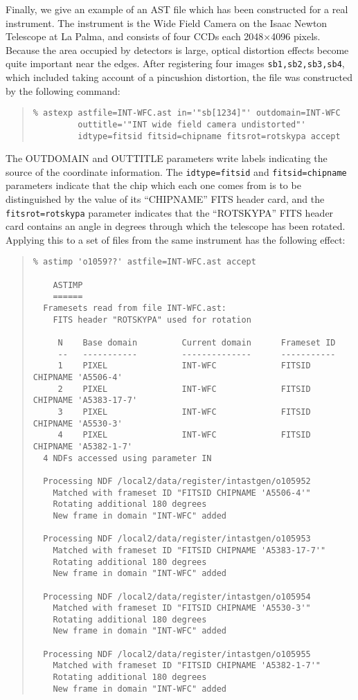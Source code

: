 \documentclass[twoside,11pt]{article}
\renewcommand{\_}{\texttt{\symbol{95}}}
\newenvironment{myquote}{\begin{quote}\begin{small}}{\end{small}\end{quote}}
\begin{document}
Finally, we give an example of an AST file which 
has been constructed for a real 
instrument.  The instrument is the Wide Field Camera on
the Isaac Newton Telescope at La Palma,
and consists of four CCDs each 2048$\times$4096 pixels.
Because the area occupied by detectors is large, 
optical distortion effects become quite important near the edges.
After registering four images {\tt sb1,sb2,sb3,sb4},
which included taking account of a pincushion distortion,
the file was constructed by the following command:
\begin{myquote}
\begin{verbatim}
% astexp astfile=INT-WFC.ast in='"sb[1234]"' outdomain=INT-WFC
         outtitle='"INT wide field camera undistorted"'
         idtype=fitsid fitsid=chipname fitsrot=rotskypa accept
\end{verbatim}
\end{myquote}
The OUTDOMAIN and OUTTITLE parameters write labels indicating 
the source of the coordinate information.
The {\tt idtype=fitsid} and {\tt fitsid=chipname} parameters 
indicate that the chip which each
one comes from is to be distinguished by the value of its
``CHIPNAME'' FITS header card, and the {\tt fitsrot=rotskypa}
parameter indicates that the ``ROTSKYPA'' FITS header card
contains an angle in degrees through which the telescope has
been rotated.
Applying this to a set of files from the same instrument has
the following effect:
\begin{myquote}
\begin{verbatim}
% astimp 'o1059??' astfile=INT-WFC.ast accept

    ASTIMP
    ======
  Framesets read from file INT-WFC.ast:
    FITS header "ROTSKYPA" used for rotation

     N    Base domain         Current domain      Frameset ID
     --   -----------         --------------      -----------
     1    PIXEL               INT-WFC             FITSID CHIPNAME 'A5506-4'
     2    PIXEL               INT-WFC             FITSID CHIPNAME 'A5383-17-7'
     3    PIXEL               INT-WFC             FITSID CHIPNAME 'A5530-3'
     4    PIXEL               INT-WFC             FITSID CHIPNAME 'A5382-1-7'
  4 NDFs accessed using parameter IN

  Processing NDF /local2/data/register/intastgen/o105952
    Matched with frameset ID "FITSID CHIPNAME 'A5506-4'"
    Rotating additional 180 degrees
    New frame in domain "INT-WFC" added

  Processing NDF /local2/data/register/intastgen/o105953
    Matched with frameset ID "FITSID CHIPNAME 'A5383-17-7'"
    Rotating additional 180 degrees
    New frame in domain "INT-WFC" added

  Processing NDF /local2/data/register/intastgen/o105954
    Matched with frameset ID "FITSID CHIPNAME 'A5530-3'"
    Rotating additional 180 degrees
    New frame in domain "INT-WFC" added

  Processing NDF /local2/data/register/intastgen/o105955
    Matched with frameset ID "FITSID CHIPNAME 'A5382-1-7'"
    Rotating additional 180 degrees
    New frame in domain "INT-WFC" added
\end{verbatim}
\end{myquote}
\end{document}
